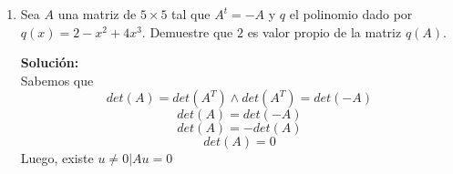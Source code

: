 \documentclass[12pt]{article}
\newenvironment{solucion}
{\begin{mdframed}[backgroundcolor=black!10]
		{\bf Solución:}\\
	}
	{
	\end{mdframed}
}
\newenvironment{preguntas}
{\begin{enumerate}\itemsep12pt
	}
	{
	\end{enumerate}
}
\newcommand{\ra}{\rightarrow}
\begin{document}
\begin{preguntas}
\begin{solucion}
En primer lugar, buscamos los valores propios,
		$$det(A-\lambda I) = \left|\begin{bmatrix} 
		1-\lambda & -2 \\ 
		1 & 3-\lambda \end{bmatrix}\right| = (1-\lambda)(3-\lambda) + 2 = \lambda^2 - 4\lambda + 5$$
		$$\lambda_{1,2} = 2 \pm i$$
		Como los valores propios son un par de complejos conjugados, los vectores propios asociados a cada uno también lo serán, por lo que basta con buscar un solo vector propio.
		
		Para $\lambda = 2+i$,
		$$(A-(2+i)\lambda)x = 0 \ra 
		\begin{bmatrix} 
		-1-i & -2 \\ 
		1 & 1-i 
		\end{bmatrix} \sim 
		\begin{bmatrix} 
		-1-i & -2 \\ 
		0 & 0
		\end{bmatrix}$$
		$$(-1-i)x_1 - 2x_2 = 0 \ra \begin{array}{lcl}
		x_1 & = & x_1 \\
		x_2 & = & \dfrac{-1-i}{2}x_1
		\end{array}$$
		Luego,
		$$v_1 = \begin{pmatrix}
		2 \\
		-1-i
		\end{pmatrix}, \quad
		v_2 = \begin{pmatrix}
		2 \\
		-1+i
		\end{pmatrix} $$
		Por último, las bases de los espacios propios están formadas por los vectores propios asociados a cada valor propio, es decir
		$$E_{2+i} = Gen\left\{\begin{pmatrix}
		2 \\
		-1-i
		\end{pmatrix}\right\}, \quad 
		E_{2-i} = Gen\left\{\begin{pmatrix}
		2 \\
		-1+i
		\end{pmatrix}\right\}$$
\end{solucion}
\item Sea $A$ una matriz de $5 \times 5$ tal que $A^t = -A$ y $q$ el polinomio dado por $q(x) = 2-x^2+4x^3$. Demuestre que $2$ es valor propio de la matriz $q(A)$.
\begin{solucion}
Sabemos que
		$$det(A) = det(A^T) \wedge det(A^T) = det(-A)$$
		$$det(A) = det(-A)$$
		$$det(A) = -det(A)$$
		$$det(A) = 0$$
		Luego, existe $u \neq 0 | Au = 0$
		

\end{solucion}
\end{preguntas}
\end{document}

